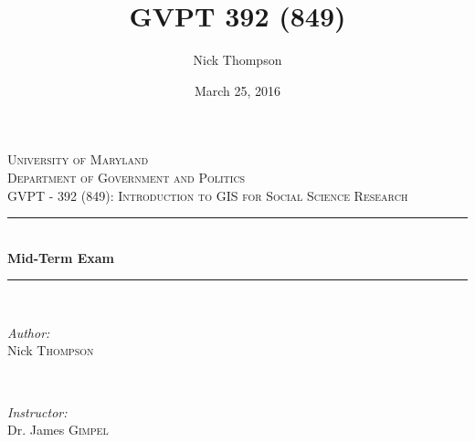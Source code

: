 \documentclass[12pt]{article}
\title{GVPT 392 (849)}
\author{Nick Thompson}
\date{March 25, 2016}                                           %
\begin{document}

\begin{titlepage}
	
	\newcommand{\HRule}{\rule{\linewidth}{0.5mm}} %
	
	\center %
	
	
	\textsc{\LARGE University of Maryland}\\[1.5cm] %
	\textsc{\Large Department of Government and Politics}\\[0.5cm] %
	\textsc{\large GVPT - 392 (849):  Introduction to GIS for Social Science Research}\\[0.5cm] %
	
	
	\HRule \\[0.4cm]
	{ \huge \bfseries Mid-Term Exam}\\[0.4cm] %
	\HRule \\[1.5cm]
	
	
	\begin{minipage}{0.4\textwidth}
		\begin{flushleft} \large
			\emph{Author:}\\
			Nick \textsc{Thompson} %
		\end{flushleft}
	\end{minipage}
	~
	\begin{minipage}{0.4\textwidth}
		\begin{flushright} \large
			\emph{Instructor:} \\
			Dr. James \textsc{Gimpel}\\ %
		\end{flushright}
	\end{minipage}\\[4cm]
	

\end{titlepage}
\end{document}
